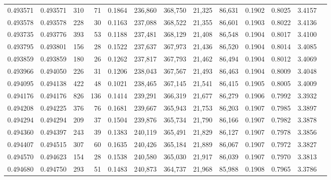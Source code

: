 \begin{tabular}{rrrrrrrrrrrrr}
0.493571 & 0.493571 &   310 &    71 &                                     0.1864 & 236,860 & 368,750 &  21,325 &  86,631 & 0.1902 & 0.8025 & 3.4157 \\
0.493578 & 0.493578 &   228 &    30 &                                     0.1163 & 237,088 & 368,522 &  21,355 &  86,601 & 0.1903 & 0.8022 & 3.4136 \\
0.493735 & 0.493776 &   393 &    53 &                                     0.1188 & 237,481 & 368,129 &  21,408 &  86,548 & 0.1904 & 0.8017 & 3.4100 \\
0.493795 & 0.493801 &   156 &    28 &                                     0.1522 & 237,637 & 367,973 &  21,436 &  86,520 & 0.1904 & 0.8014 & 3.4085 \\
0.493859 & 0.493859 &   180 &    26 &                                     0.1262 & 237,817 & 367,793 &  21,462 &  86,494 & 0.1904 & 0.8012 & 3.4069 \\
0.493966 & 0.494050 &   226 &    31 &                                     0.1206 & 238,043 & 367,567 &  21,493 &  86,463 & 0.1904 & 0.8009 & 3.4048 \\
0.494095 & 0.494138 &   422 &    48 &                                     0.1021 & 238,465 & 367,145 &  21,541 &  86,415 & 0.1905 & 0.8005 & 3.4009 \\
0.494176 & 0.494176 &   826 &   136 &                                     0.1414 & 239,291 & 366,319 &  21,677 &  86,279 & 0.1906 & 0.7992 & 3.3932 \\
0.494208 & 0.494225 &   376 &    76 &                                     0.1681 & 239,667 & 365,943 &  21,753 &  86,203 & 0.1907 & 0.7985 & 3.3897 \\
0.494294 & 0.494294 &   209 &    37 &                                     0.1504 & 239,876 & 365,734 &  21,790 &  86,166 & 0.1907 & 0.7982 & 3.3878 \\
0.494360 & 0.494397 &   243 &    39 &                                     0.1383 & 240,119 & 365,491 &  21,829 &  86,127 & 0.1907 & 0.7978 & 3.3856 \\
0.494407 & 0.494515 &   307 &    60 &                                     0.1635 & 240,426 & 365,184 &  21,889 &  86,067 & 0.1907 & 0.7972 & 3.3827 \\
0.494570 & 0.494623 &   154 &    28 &                                     0.1538 & 240,580 & 365,030 &  21,917 &  86,039 & 0.1907 & 0.7970 & 3.3813 \\
0.494680 & 0.494750 &   293 &    51 &                                     0.1483 & 240,873 & 364,737 &  21,968 &  85,988 & 0.1908 & 0.7965 & 3.3786 \\

\end{tabular}
